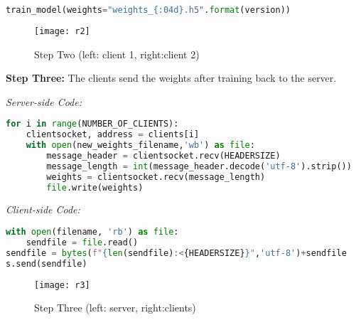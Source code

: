 \begin{center}{\begin{minipage}{0.9\linewidth}
\begin{lstlisting}[language=Python, basicstyle=\fontsize{10}{10}\selectfont\ttfamily]
train_model(weights="weights_{:04d}.h5".format(version))
\end{lstlisting}
\end{minipage}}\end{center}

\begin{figure}[H]
	\centering
	\texttt{[image: r2]}
	\caption{Step Two (left: client 1, right:client 2)}
	\label{f10}
\end{figure}


\textbf{Step Three:} The clients send the weights after training back to the server. 

\textit{Server-side Code:}

\begin{center}{\begin{minipage}{0.9\linewidth}
\begin{lstlisting}[language=Python, basicstyle=\fontsize{10}{10}\selectfont\ttfamily]
for i in range(NUMBER_OF_CLIENTS):
    clientsocket, address = clients[i]
    with open(new_weights_filename,'wb') as file:
        message_header = clientsocket.recv(HEADERSIZE)
        message_length = int(message_header.decode('utf-8').strip())
        weights = clientsocket.recv(message_length)
        file.write(weights)
\end{lstlisting}
\end{minipage}}\end{center}

\textit{Client-side Code:}

\begin{center}{\begin{minipage}{0.9\linewidth}
\begin{lstlisting}[language=Python, basicstyle=\fontsize{10}{10}\selectfont\ttfamily]
with open(filename, 'rb') as file:
    sendfile = file.read()
sendfile = bytes(f"{len(sendfile):<{HEADERSIZE}}",'utf-8')+sendfile
s.send(sendfile)
\end{lstlisting}
\end{minipage}}\end{center}

\begin{figure}[H]
	\centering
	\texttt{[image: r3]}
	\caption{Step Three (left: server, right:clients)}
	\label{f10}
\end{figure}

